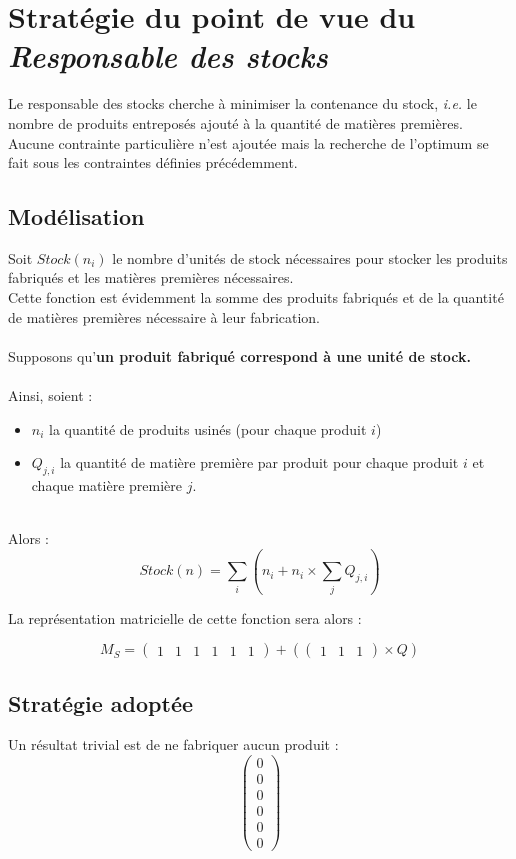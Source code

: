 \newpage
\section{Stratégie du point de vue du \textsl{Responsable des stocks}}
\label{sec:stocks}

Le responsable des stocks cherche à minimiser la contenance du stock,
\textsl{i.e.} le nombre de produits entreposés ajouté à la quantité de
matières premières. Aucune contrainte particulière n'est ajoutée mais la
recherche de l'optimum se fait sous les contraintes définies précédemment.

\subsection{Modélisation}
Soit $Stock(n_{i})$ le nombre d'unités de stock nécessaires pour stocker les
produits fabriqués et les matières premières nécessaires.\\
Cette fonction est évidemment la somme des produits fabriqués et de la quantité de matières
premières nécessaire à leur fabrication.\\
~\\
Supposons qu'\textbf{un produit fabriqué correspond à une unité de stock.}\\
~\\
Ainsi, soient :
\begin{itemize}
	\item $n_{i}$ la quantité de produits usinés (pour chaque produit $i$)
	\item $Q_{j,i}$ la quantité de matière première par produit pour chaque produit $i$ et chaque matière première $j$.
\end{itemize}
~\\
Alors :
\begin{equation}
	Stock(n) = \sum_{i} (n_{i} + n_{i} \times \sum_{j} Q_{j,i})
\end{equation}

La représentation matricielle de cette fonction sera alors :

\begin{equation}
	M_S = \begin{pmatrix}
		1 & 1 & 1 & 1 & 1 & 1
	\end{pmatrix} + (
	\begin{pmatrix}
		1 & 1 & 1
	\end{pmatrix}
	\times Q)
\end{equation}

\subsection{Stratégie adoptée}
Un résultat trivial est de ne fabriquer aucun produit :
\begin{equation}
    \begin{pmatrix}
	0 \\ 0 \\ 0 \\ 0 \\ 0 \\ 0
    \end{pmatrix}
\end{equation}

